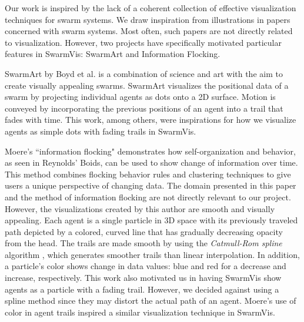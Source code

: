 \documentclass{vgtc}
\begin{document}
Our work is inspired by the lack of a coherent collection of effective visualization techniques for swarm systems.
We draw inspiration from illustrations in papers concerned with swarm systems. Most often, such papers are not directly related to visualization.
However, two projects have specifically motivated particular features in SwarmVis: SwarmArt\cite{Boyd} and
Information Flocking\cite{1382896}.

SwarmArt by Boyd et al. is a combination of science and art with the aim to create visually appealing swarms.
SwarmArt visualizes the positional data of a swarm by projecting individual agents as dots onto a 2D surface.
Motion is conveyed by incorporating the previous positions of an agent into a trail that fades with time.
This work, among others\cite{codeswarm:website}\cite{joshi2005iit},
were inspirations for how we visualize agents as simple dots with fading trails
in SwarmVis.

Moere's ``information flocking" demonstrates how self-organization and behavior,
as seen in Reynolds' Boids, can be used to show change of information over time\cite{1382896}.
This method combines flocking behavior rules
and clustering techniques to give users a unique perspective of changing data.
The domain presented in this paper and the method of information flocking are not directly relevant to our project.
However, the visualizations created by this author are smooth and visually appealing.
Each agent is a single particle in 3D space with its previously traveled path depicted by a colored,
curved line that has gradually decreasing opacity from the head.
The trails are made smooth by using the {\em Catmull-Rom spline} algorithm \cite{378511},
which generates smoother trails than linear interpolation.
In addition, a particle's color shows change in data values: blue and red for a decrease and increase, respectively.
This work also motivated us in having SwarmVis show agents as a particle with a fading trail.
However, we decided against using a spline method since they may distort the actual path of an agent.
Moere's use of color in agent trails inspired a similar visualization technique in SwarmVis.
\end{document}
